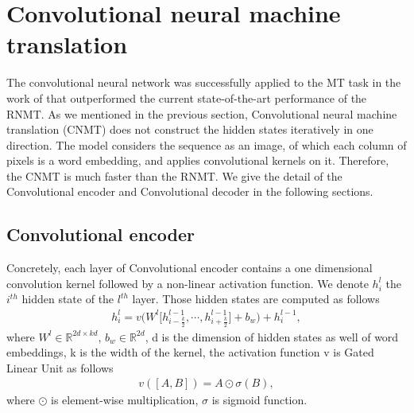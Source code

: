 \section{Convolutional neural machine translation} \label{sec:cnn}
The convolutional neural network was successfully applied to the MT task in the work of \citet{Ghering17convolutional} that outperformed the current state-of-the-art performance of the RNMT. As we mentioned in the previous section, Convolutional neural machine translation (CNMT) does not construct the hidden states iteratively in one direction. The model considers the sequence as an image, of which each column of pixels is a word embedding, and applies convolutional kernels on it. Therefore, the CNMT is much faster than the RNMT. We give the detail of the Convolutional encoder and Convolutional decoder in the following sections.
\subsection{Convolutional encoder}
Concretely, each layer of Convolutional encoder contains a one dimensional convolution kernel followed by a non-linear activation function. We denote $h^l_i$ the $i^{th}$ hidden state of the $l^{th}$ layer. Those hidden states are computed as follows
\begin{equation}
\begin{array}{lcr}
h^l_i = v\bigg( W^l \big[h^{l-1}_{i-\frac{k}{2}}, \cdots, h^{l-1}_{i+\frac{k}{2}} \big] + b_w \bigg) + h^{l-1}_{i},
\end{array}
\end{equation}
where $W^l \in \mathbb{R}^{2d \times kd}$, $b_w \in \mathbb{R}^{2d}$, d is the dimension of hidden states as well of word embeddings, k is the width of the kernel, the activation function v is Gated Linear Unit \citep{Ghering17convolutional} as follows
\begin{equation}
\begin{array}{lcr}
v([A,B]) = A \odot \sigma(B),
\end{array}
\end{equation}
where $\odot$ is element-wise multiplication, $\sigma$ is sigmoid function.
